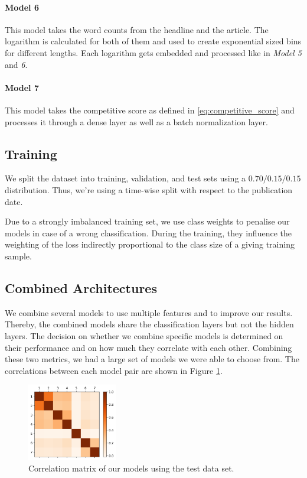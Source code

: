 \paragraph{Model 6} 
This model takes the word counts from the headline and the article.
The logarithm is calculated for both of them and used to create exponential sized bins for different lengths.
Each logarithm gets embedded and processed like in \textit{Model 5} and \textit{6}.

\paragraph{Model 7} 
This model takes the competitive score as defined in \autoref{eq:competitive_score} and processes it through a dense layer as well as a batch normalization layer.

\subsection{Training}
We split the dataset into training, validation, and test sets using a $0.70/0.15/0.15$ distribution.
Thus, we're using a time-wise split with respect to the publication date.

Due to a strongly imbalanced training set, we use class weights to penalise our models in case of a wrong classification.
During the training, they influence the weighting of the loss indirectly proportional to the class size of a giving training sample.

\subsection{Combined Architectures}
We combine several models to use multiple features and to improve our results.
Thereby, the combined models share the classification layers but not the hidden layers.
The decision on whether we combine specific models is determined on their performance and on how much they correlate with each other.
Combining these two metrics, we had a large set of models we were able to choose from.
The correlations between each model pair are shown in Figure \ref{fig:correlation_matrix}. 

\begin{figure}[h]
	\includegraphics[width=0.35\textwidth]{fig/correlations.png}
	\caption{\textmd{Correlation matrix of our models using the test data set.}}
	\label{fig:correlation_matrix}
\end{figure}